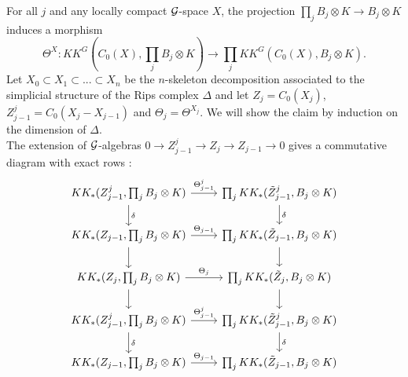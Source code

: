 \begin{dem}
For all $j$ and any locally compact $\mathcal G$-space $X$, the projection $\prod_j B_j\otimes K\rightarrow B_j \otimes K$ induces a morphism
\[\Theta^X : KK^G(C_0(X),\prod_j B_j\otimes K )\rightarrow \prod_j  KK^G(C_0(X),B_j\otimes K ).\]
Let $X_0\subset X_1 \subset ...\subset X_n$ be the $n$-skeleton decomposition associated to the simplicial structure of the Rips complex $\Delta$ and let $Z_j = C_0(X_j)$, $Z^j_{j-1} = C_0(X_j-X_{j-1})$ and $\Theta_j = \Theta^{X_j}$.
We will show the claim by induction on the dimension of $\Delta$.\\

The extension of $\mathcal G$-algebras $0\rightarrow Z^j_{j-1} \rightarrow Z_j \rightarrow Z_{j-1}\rightarrow 0$ gives a commutative diagram with exact rows :
\[\begin{tikzcd}
KK_*(Z^j_{j-1},\prod_j B_j\otimes K)\arrow{d}{\delta}\arrow{r}{\Theta^j_{j-1}} & \prod_j KK_*(\tilde Z^j_{j-1},B_j \otimes K)\arrow{d}{\delta} \\
KK_*(Z_{j-1},\prod_j B_j\otimes K)\arrow{d}\arrow{r}{\Theta_{j-1}}  &  \prod_j KK_*(\tilde Z_{j-1},B_j \otimes K)\arrow{d} \\
KK_*(Z_j,\prod_j B_j\otimes K)\arrow{d}\arrow{r}{\Theta_j} & \prod_j KK_*(\tilde Z_j,B_j \otimes K)\arrow{d} \\
KK_*(Z^j_{j-1},\prod_j B_j\otimes K)\arrow{d}{\delta} \arrow{r}{\Theta^j_{j-1}} & \prod_j KK_*(\tilde Z^j_{j-1},B_j \otimes K)\arrow{d}{\delta}\\
KK_*(Z_{j-1},\prod_j B_j\otimes K)\arrow{r}{\Theta_{j-1}} & \prod_j KK_*(\tilde Z_{j-1},B_j \otimes K)
\end{tikzcd}\]


\end{dem}

